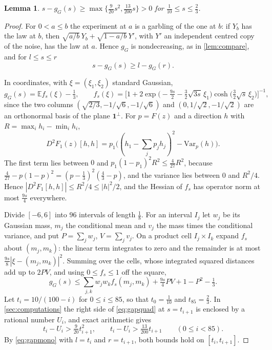 \documentclass[11pt]{amsart}
\newtheorem{lemma}[theorem]{Lemma}
\theoremstyle{definition}
\theoremstyle{remark}
\newcommand{\E}{\mathbb{E}}
\newcommand{\one}{\mathbf{1}}
\begin{document}
\begin{lemma}\label{lem:gap}
$s-g_G(s)\ge\max\{\tfrac9{20}s^2,\tfrac{13}{200}s\}>0$ for $\tfrac1{10}\le s\le\tfrac23$.
\end{lemma}

\begin{proof}
For $0<a\le b$ the experiment at $a$ is a garbling of the one at $b$: if $Y_b$ has the law at $b$, then
$\sqrt{a/b}\,Y_b+\sqrt{1-a/b}\,Y'$, with $Y'$ an independent centred copy of the noise, has the law at $a$. Hence
$g_G$ is nondecreasing, as in \cref{lem:compare}, and for $l\le s\le r$
\begin{equation}\label{eq:gapmono}
s-g_G(s)\ge l-g_G(r).
\end{equation}

In coordinates, with $\xi=(\xi_1,\xi_2)$ standard Gaussian,
\[
g_G(s)=\E f_s(\xi)-\tfrac13,\qquad
f_s(\xi)=\Big[1+2\exp\big(-\tfrac{9s}2-\tfrac32\sqrt{3s}\,\xi_1\big)\cosh\big(\tfrac32\sqrt s\,\xi_2\big)\Big]^{-1},
\]
since the two columns $(\sqrt{2/3},-1/\sqrt6,-1/\sqrt6)$ and $(0,1/\sqrt2,-1/\sqrt2)$ are an orthonormal basis of the
plane $\one^\perp$. For $p=F(z)$ and a direction $h$ with $R=\max_ih_i-\min_ih_i$,
\[
D^2F_1(z)[h,h]=p_1\big((h_1-\textstyle\sum_jp_jh_j)^2-\mathrm{Var}_p(h)\big).
\]
The first term lies between $0$ and $p_1(1-p_1)^2R^2\le\tfrac4{27}R^2$, because
$\tfrac4{27}-p(1-p)^2=(p-\tfrac13)^2(\tfrac43-p)$, and the variance lies between $0$ and $R^2/4$. Hence
$|D^2F_1[h,h]|\le R^2/4\le|h|^2/2$, and the Hessian of $f_s$ has operator norm at most $\tfrac{9s}4$ everywhere.

Divide $[-6,6]$ into $96$ intervals of length $\tfrac18$. For an interval $I_j$ let $w_j$ be its Gaussian mass,
$m_j$ the conditional mean and $v_j$ the mass times the conditional variance, and put $P=\sum_jw_j$,
$V=\sum_jv_j$. On a product cell $I_j\times I_k$ expand $f_s$ about $(m_j,m_k)$: the linear term integrates to
zero and the remainder is at most $\tfrac{9s}8|\xi-(m_j,m_k)|^2$. Summing over the cells, whose integrated squared
distances add up to $2PV$, and using $0\le f_s\le1$ off the square,
\begin{equation}\label{eq:gapquad}
g_G(s)\le\sum_{j,k}w_jw_kf_s(m_j,m_k)+\tfrac{9s}4PV+1-P^2-\tfrac13.
\end{equation}
Let $t_i=10/(100-i)$ for $0\le i\le85$, so that $t_0=\tfrac1{10}$ and $t_{85}=\tfrac23$. In
\cref{sec:computations} the right side of \eqref{eq:gapquad} at $s=t_{i+1}$ is enclosed by a rational number
$U_i$, and exact arithmetic gives
\[
t_i-U_i>\tfrac9{20}t_{i+1}^2,\qquad t_i-U_i>\tfrac{13}{200}t_{i+1}\qquad(0\le i<85).
\]
By \eqref{eq:gapmono} with $l=t_i$ and $r=t_{i+1}$, both bounds hold on $[t_i,t_{i+1}]$.
\end{proof}
\end{document}
